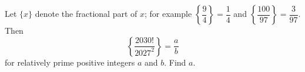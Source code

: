 Let $\{x\}$ denote the fractional part of $x$; for example $\left\{\dfrac94\right\}=\dfrac14$ and $\left\{\dfrac{100}{97}\right\}=\dfrac3{97}$. Then
\[\left\{\dfrac{2030!}{2027^2}\right\}=\dfrac ab\]
for relatively prime positive integers $a$ and $b$. Find $a$.
